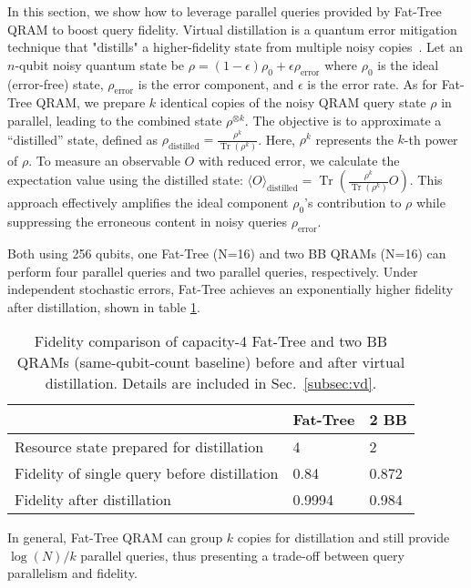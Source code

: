 In this section, we show how to leverage parallel queries provided by Fat-Tree QRAM to boost query fidelity. Virtual distillation is a quantum error mitigation technique that "distills" a higher-fidelity state from multiple noisy copies~\cite{huggins2021virtual}. Let an $n$-qubit noisy quantum state be $\rho = (1 - \epsilon)\rho_0 + \epsilon \rho_{\text{error}}$ where $\rho_0$ is the ideal (error-free) state, $\rho_{\text{error}}$ is the error component, and $\epsilon$ is the error rate. As for Fat-Tree QRAM, we prepare $k$ identical copies of the noisy QRAM query 
state $\rho$ in parallel, leading to the combined state $\rho^{\otimes k}$. The objective is to approximate a ``distilled'' state, defined as
$\rho_{\text{distilled}} = \frac{\rho^k}{\operatorname{Tr}(\rho^k)}$. Here, $\rho^k$ represents the $k$-th power of $\rho$.
To measure an observable \( O \) with reduced error, we calculate the expectation value using the distilled state: $\langle O \rangle_{\text{distilled}} = \operatorname{Tr}\left( \frac{\rho^k}{\operatorname{Tr}(\rho^k)} O \right)$. This approach effectively amplifies the ideal component $\rho_0$'s contribution to $\rho$ while suppressing the erroneous content in noisy queries $\rho_{\text{error}}$.

Both using 256 qubits, one Fat-Tree (N=16) and two BB QRAMs (N=16) can perform four parallel queries and two parallel queries, respectively. Under independent stochastic errors, Fat-Tree achieves an exponentially higher fidelity after distillation, shown in table \ref{tab:distill}.

\begin{table}[t]
\small
\centering
\begin{tabular}{ p{5.2cm}||p{1.2cm}|p{0.8cm}}
\hline
 & Fat-Tree & 2 BB \\ \hline
Resource state prepared for distillation & 4 & 2 \\ \hline
Fidelity of single query before distillation & 0.84 & 0.872 \\ \hline
Fidelity after distillation & 0.9994 & 0.984 \\ \hline
\end{tabular}
\caption{Fidelity comparison of capacity-4 Fat-Tree and two BB QRAMs (same-qubit-count baseline) before and after virtual distillation. Details are included in Sec.~\ref{subsec:vd}.}
\label{tab:distill}
\end{table}

In general, Fat-Tree QRAM can group $k$ copies for distillation and still provide $\log(N)/k$ parallel queries, thus presenting a trade-off between query parallelism and fidelity.

